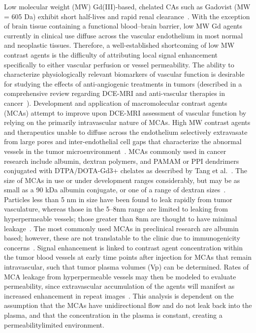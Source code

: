 Low molecular weight (MW) Gd(III)-based, chelated CAs such as Gadovist (MW = 605 Da) exhibit short half-lives and rapid renal clearance~\cite{Weinmann:1984gv}.
With the exception of brain tissue containing a functional blood–brain barrier, low MW Gd agents currently in clinical use diffuse across the vascular endothelium in most normal and neoplastic tissues.
Therefore, a well-established shortcoming of low MW contrast agents is the difficulty of attributing local signal enhancement specifically to either vascular perfusion or vessel permeability.
The ability to characterize physiologically relevant biomarkers of vascular function is desirable for studying the effects of anti-angiogenic treatments in tumors (described in a comprehensive review regarding DCE-MRI and anti-vascular therapies in cancer~\cite{OConnor:2012ie}).
Development and application of macromolecular contrast agents (MCAs) attempt to improve upon DCE-MRI assessment of vascular function by relying on the primarily intravascular nature of MCAs.
High MW contrast agents and therapeutics unable to diffuse across the endothelium selectively extravasate from large pores and inter-endothelial cell gaps that characterize the abnormal vessels in the tumor microenvironment~\cite{McDonald:2002ut,Hashizume:2000bq}.
MCAs commonly used in cancer research include albumin, dextran polymers, and PAMAM or PPI dendrimers conjugated with DTPA/DOTA-Gd3+ chelates as described by Tang et al.~\cite{Tang:2013fi}.
The size of MCAs in use or under development ranges considerably, but may be as small as a 90 kDa albumin conjugate, or one of a range of dextran sizes~\cite{Barrett:2006jx}.
Particles less than 5 nm in size have been found to leak rapidly from tumor vasculature, whereas those in the 5–8nm range are limited to leaking from hyperpermeable vessels; those greater than 8nm are thought to have minimal leakage~\cite{Kobayashi:2004vq,Sato:2001tt}.
The most commonly used MCAs in preclinical research are albumin based; however, these are not translatable to the clinic due to immunogenicity concerns~\cite{Ogan:1987tg}.
Signal enhancement is linked to contrast agent concentration within the tumor blood vessels at early time points after injection for MCAs that remain intravascular, such that tumor plasma volumes (Vp) can be determined.
Rates of MCA leakage from hyperpermeable vessels may then be modeled to evaluate permeability, since extravascular accumulation of the agents will manifest as increased enhancement in repeat images~\cite{Ogan:1987tg,Turetschek:2004bw}.
This analysis is dependent on the assumption that the MCAs have unidirectional flow and do not leak back into the plasma, and that the concentration in the plasma is constant, creating a permeabilitylimited environment.
